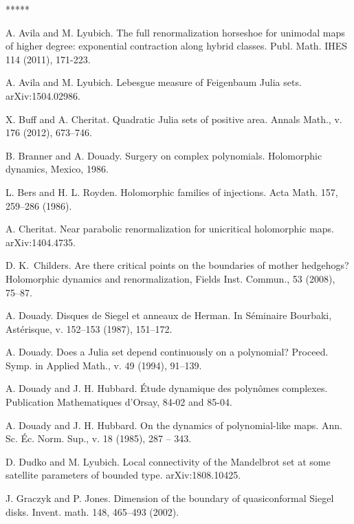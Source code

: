 
\begin{thebibliography}{*****}




 A. Avila and M. Lyubich. 
  The full renormalization horseshoe for unimodal maps of higher
  degree: exponential contraction along hybrid classes.
Publ. Math. IHES 114 (2011), 171-223. 

 A. Avila and M. Lyubich. 
Lebesgue measure of Feigenbaum Julia sets. arXiv:1504.02986. 


 X. Buff and A. Cheritat. Quadratic Julia sets of
  positive area. Annals Math., v. 176 (2012), 673--746.

 B. Branner and A. Douady. Surgery on complex polynomials. Holomorphic dynamics, {M}exico, 1986.


L. Bers and H. L. Royden. Holomorphic families of injections. Acta Math. 157, 259--286 (1986).


  A. Cheritat. Near parabolic renormalization for unicritical holomorphic maps. arXiv:1404.4735.


   
  D. K.~Childers. Are there critical points on the boundaries of mother hedgehogs? Holomorphic dynamics and renormalization, Fields Inst. Commun., 53 (2008), 75–87.  



 A. Douady. Disques de Siegel et anneaux de Herman. In S\'eminaire Bourbaki,
  Ast\'erisque, v. 152--153 (1987), 151--172. 



 A. Douady. Does a Julia set depend continuously on a polynomial?
   Proceed. Symp. in Applied Math., v. 49 (1994), 91--139.

 A. Douady and J. H. Hubbard.
  \'{E}tude dynamique des polyn\^{o}mes complexes.
 Publication Mathematiques d'Orsay,
84-02 and 85-04.

 A. Douady and J. H. Hubbard. On the dynamics of polynomial-like maps.
   Ann. Sc. \'{E}c. Norm. Sup., v. 18 (1985), 287 -- 343.


 D. Dudko and M. Lyubich. Local connectivity of the Mandelbrot set at some satellite parameters of bounded type. arXiv:1808.10425.


 J. Graczyk and P. Jones. Dimension of the boundary of quasiconformal Siegel disks. Invent. math. 148, 465--493 (2002).



\end{thebibliography}
